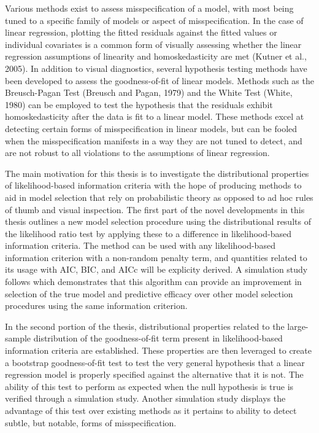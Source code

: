 		Various methods exist to assess misspecification of a model, with most being tuned to a specific family of models or aspect of misspecification. In the case of linear regression,
		plotting the fitted residuals against the fitted values or individual covariates is a common form of visually assessing whether the linear regression assumptions of linearity and
		homoskedasticity are met (Kutner et al., 2005). In addition to visual diagnostics, several hypothesis testing methods have been developed to assess the goodness-of-fit of linear
		models. Methods such as the Breusch-Pagan Test (Breusch and Pagan, 1979) and the White Test (White, 1980) can be employed to test the hypothesis that the residuals exhibit homoskedasticity
		after the data is fit to a linear model. These methods excel at detecting certain forms of misspecification in linear models, but can be fooled when the misspecification manifests in a
		way they are not tuned to detect, and are not robust to all violations to the assumptions of linear regression.

		The main motivation for this thesis is to investigate the distributional properties of likelihood-based information criteria with the hope of producing methods to aid in model selection
		that rely on probabilistic theory as opposed to ad hoc rules of thumb and visual inspection. The first part of the novel developments in this thesis outlines a new model selection procedure using the distributional
		results of the likelihood ratio test by applying these to a difference in likelihood-based information criteria. The method can be used with any likelihood-based information criterion
		with a non-random penalty term, and quantities related to its usage with AIC, BIC, and AICc will be explicity derived. A simulation study follows which demonstrates that this algorithm
		can provide an improvement in selection of the true model and predictive efficacy over other model selection procedures using the same information criterion.
		
		In the second portion of the thesis, distributional properties related to the large-sample distribution of the goodness-of-fit term present in likelihood-based information criteria
		are established. These properties are then leveraged to create a bootstrap goodness-of-fit test to test the very general hypothesis that a linear regression model is properly specified
		against the alternative that it is not. The ability of this test to perform as expected when the null hypothesis is true is verified through a simulation study. Another simulation
		study displays the advantage of this test over existing methods as it pertains to ability to detect subtle, but notable, forms of misspecification.

